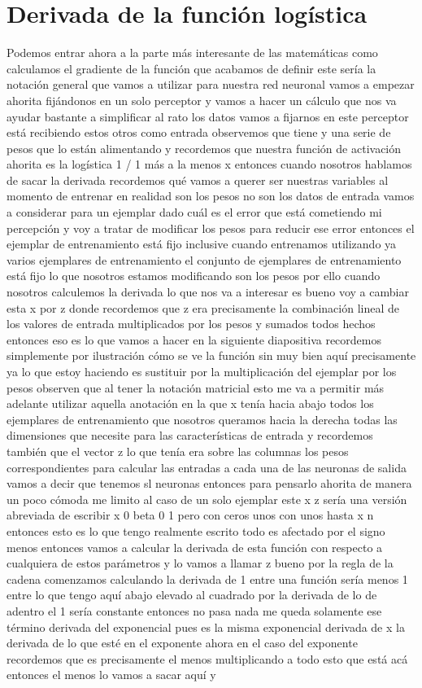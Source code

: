 \section{Derivada de la función logística}

Podemos entrar ahora a la parte más interesante de las matemáticas como calculamos el gradiente de la función que acabamos de definir este sería la notación general que vamos a utilizar para nuestra red neuronal vamos a empezar ahorita fijándonos en un solo perceptor y vamos a hacer un cálculo que nos va ayudar bastante a simplificar al rato los datos vamos a fijarnos en este perceptor está recibiendo estos otros como entrada observemos que tiene y una serie de pesos que lo están alimentando y recordemos que nuestra función de activación ahorita es la logística 1 / 1 más a la menos x entonces cuando nosotros hablamos de sacar la derivada recordemos qué vamos a querer ser nuestras variables al momento de entrenar en realidad son los pesos no son los datos de entrada vamos a considerar para un ejemplar dado cuál es el error que está cometiendo mi percepción y voy a tratar de modificar los pesos para reducir ese error entonces el ejemplar de entrenamiento está fijo inclusive cuando entrenamos utilizando ya varios ejemplares de entrenamiento el conjunto de ejemplares de entrenamiento está fijo lo que nosotros estamos modificando son los pesos por ello cuando nosotros calculemos la derivada lo que nos va a interesar es bueno voy a cambiar esta x por z donde recordemos que z era precisamente la combinación lineal de los valores de entrada multiplicados por los pesos y sumados todos hechos entonces eso es lo que vamos a hacer en la siguiente diapositiva recordemos simplemente por ilustración cómo se ve la función sin muy bien aquí precisamente ya lo que estoy haciendo es sustituir por la multiplicación del ejemplar por los pesos observen que al tener la notación matricial esto me va a permitir más adelante utilizar aquella anotación en la que x tenía hacia abajo todos los ejemplares de entrenamiento que nosotros queramos hacia la derecha todas las dimensiones que necesite para las características de entrada y recordemos también que el vector z lo que tenía era sobre las columnas los pesos correspondientes para calcular las entradas a cada una de las neuronas de salida vamos a decir que tenemos sl neuronas entonces para pensarlo ahorita de manera un poco cómoda me limito al caso de un solo ejemplar este x z sería una versión abreviada de escribir x 0 beta 0 1 pero con ceros unos con unos hasta x n entonces esto es lo que tengo realmente escrito todo es afectado por el signo menos entonces vamos a calcular la derivada de esta función con respecto a cualquiera de estos parámetros y lo vamos a llamar z bueno por la regla de la cadena comenzamos calculando la derivada de 1 entre una función sería menos 1 entre lo que tengo aquí abajo elevado al cuadrado por la derivada de lo de adentro el 1 sería constante entonces no pasa nada me queda solamente ese término derivada del exponencial pues es la misma exponencial derivada de x la derivada de lo que esté en el exponente ahora en el caso del exponente recordemos que es precisamente el menos multiplicando a todo esto que está acá entonces el menos lo vamos a sacar aquí y 